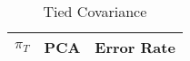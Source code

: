 \begin{center}
\begin{longtable}{|c|c|c|}
\caption{Tied Covariance}\label{tab:mvg_tiedcov}\\
\hline
$\pi_T$ & PCA & Error Rate\\
\hline
\hline
\end{longtable}
\end{center}
